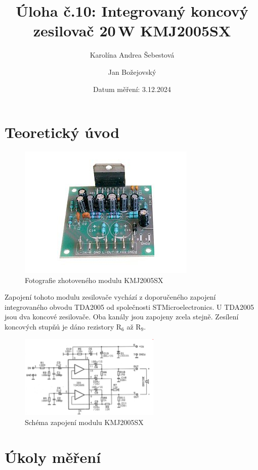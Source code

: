 \documentclass[a4paper, czech]{article}
\title{Úloha č.10: Integrovaný koncový zesilovač 20\,W KMJ2005SX}
\author{Karolína Andrea Šebestová \and Jan Božejovský}
\date{Datum měření: 3.12.2024}
\begin{document}
\maketitle

\section{Teoretický úvod}

\begin{figure}[H]
    \centering
    \includegraphics[]{kmj2005.jpg}
    \caption{Fotografie zhotoveného modulu KMJ2005SX}
\end{figure}

Zapojení tohoto modulu zesilovače vychází z doporučeného zapojení integrovaného
obvodu TDA2005 od společnosti STMicroelectronics.
U TDA2005 jsou dva koncové zesilovače.
Oba kanály jsou zapojeny zcela stejně.
Zesílení koncových stupňů je dáno rezistory R$_6$ až R$_9$.

\begin{figure}[H]
    \centering
    \includegraphics[width=0.6\textwidth]{schema.png}
    \caption{Schéma zapojení modulu KMJ2005SX}
\end{figure}

\section{Úkoly měření}
\end{document}

